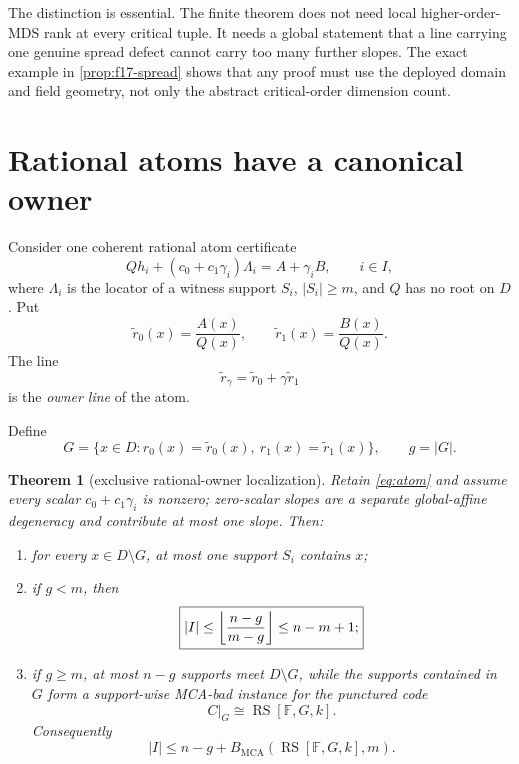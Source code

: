 \documentclass[11pt,a4paper]{amsart}
\numberwithin{equation}{section}
\newtheorem{theorem}{Theorem}[section]
\theoremstyle{remark}
\DeclareMathOperator{\RS}{RS}\DeclareMathOperator{\MCA}{MCA}\DeclareMathOperator{\CA}{CA}
\newcommand{\F}{\mathbb F}\newcommand{\B}{\mathbb B}\newcommand{\K}{\mathbb K}\newcommand{\Z}{\mathbb Z}
\newcommand{\Bbad}{B_{\mathrm{MCA}}}
\begin{document}
\begin{remark}
The distinction is essential.  The finite theorem does not need local higher-order-MDS rank at every critical tuple.  It needs a global statement that a line carrying one genuine spread defect cannot carry too many further slopes.  The exact example in \cref{prop:f17-spread} shows that any proof must use the deployed domain and field geometry, not only the abstract critical-order dimension count.
\end{remark}

\section{Rational atoms have a canonical owner}

Consider one coherent rational atom certificate
\begin{equation}\label{eq:atom}
 Qh_i+(c_0+c_1\gamma_i)\Lambda_i=A+\gamma_iB,
 \qquad i\in I,
\end{equation}
where $\Lambda_i$ is the locator of a witness support $S_i$, $|S_i|\ge m$, and $Q$ has no root on $D$.  Put
\[
 \widetilde r_0(x)=\frac{A(x)}{Q(x)},
 \qquad
 \widetilde r_1(x)=\frac{B(x)}{Q(x)}.
\]
The line
\[
 \widetilde r_\gamma=\widetilde r_0+\gamma\widetilde r_1
\]
is the \emph{owner line} of the atom.

\begin{definition}\label{def:owner-set}
Define
\[
 G=\{x\in D:r_0(x)=\widetilde r_0(x),\ r_1(x)=\widetilde r_1(x)\},
 \qquad g=|G|.
\]
\end{definition}

\begin{theorem}[exclusive rational-owner localization]\label{thm:owner-localization}
Retain \eqref{eq:atom} and assume every scalar $c_0+c_1\gamma_i$ is nonzero; zero-scalar slopes are a separate global-affine degeneracy and contribute at most one slope.  Then:
\begin{enumerate}[label=\textup{(\alph*)}]
\item for every $x\in D\setminus G$, at most one support $S_i$ contains $x$;
\item if $g<m$, then
\[
 \boxed{
 |I|\le\left\lfloor \frac{n-g}{m-g}\right\rfloor\le n-m+1;
 }
\]
\item if $g\ge m$, at most $n-g$ supports meet $D\setminus G$, while the supports contained in $G$ form a support-wise MCA-bad instance for the punctured code
\[
 C|_G\cong\RS[\F,G,k].
\]
Consequently
\[
 \boxed{
 |I|\le n-g+\Bbad(\RS[\F,G,k],m).
 }
\]
\end{enumerate}
\end{theorem}
\end{document}
